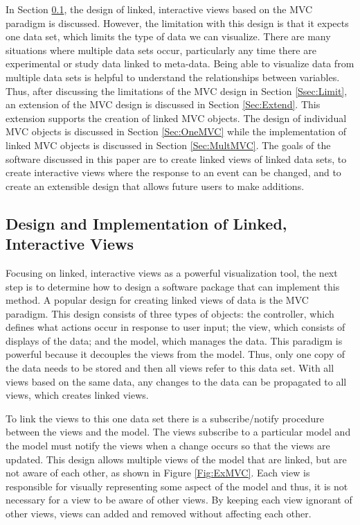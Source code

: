 \documentclass{article}[11pt]
\begin{document}
In Section \ref{Ssec:Design}, the design of linked, interactive views based on
the MVC paradigm is discussed.  However, the limitation with this design is
that it expects one data set, which limits the type of data we can visualize.
There are many situations where multiple data sets occur, particularly any
time there are experimental or study data linked to meta-data.  Being able to
visualize data from multiple data sets is helpful to understand the
relationships between variables.  Thus, after discussing the limitations of
the MVC design in Section \ref{Ssec:Limit}, an extension of the MVC design is
discussed in Section \ref{Sec:Extend}.  This extension supports the creation of
linked MVC objects.  The design of individual MVC objects is discussed in
Section \ref{Sec:OneMVC} while the implementation of linked MVC objects is
discussed in Section \ref{Sec:MultMVC}.  The goals of the software discussed
in this paper are to create linked views of linked data sets, to create
interactive views where the response to an event can be changed, and to create
an extensible design that allows future users to make additions.

\subsection{Design and Implementation of Linked, Interactive
  Views}\label{Ssec:Design} 

Focusing on linked, interactive views as a powerful visualization tool, the
next step is to determine how to design a software package that can implement
this method.  A popular design for creating linked views of data is the
MVC paradigm.  This design consists of three types of objects: the controller,
which defines what actions occur in response to user input; the view, which
consists of displays of the data; and the model, which manages the data.  This
paradigm is powerful because it decouples the views from the model.  Thus,
only one copy of the data needs to be stored and then all views refer to this
data set.  With all views based on the same data, any changes to the data can
be propagated to all views, which creates linked views. 

To link the views to this one data set there is a subscribe/notify procedure
between the views and the model.  The views subscribe to a particular model
and the model must notify the views when a change occurs so that the views
are updated.  This design allows multiple views of the model that are
linked, but are not aware of each other, as shown in Figure \ref{Fig:ExMVC}.
Each view is responsible for visually representing some aspect of the model
and thus, it is not necessary for a view to be aware of other views.  By
keeping each view ignorant of other views, views can added and removed without
affecting each other. 
\end{document}

